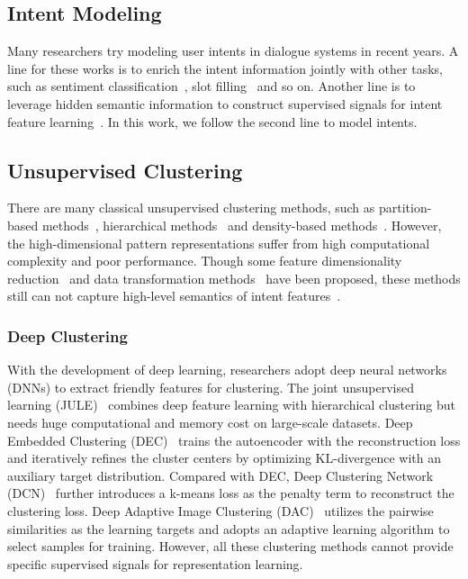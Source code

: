 \documentclass[letterpaper]{article} \usepackage{aaai21}  \usepackage{times}  \usepackage{helvet} \usepackage{courier}  \usepackage[hyphens]{url}  \usepackage{graphicx} \urlstyle{rm} \def\UrlFont{\rm}  \usepackage{natbib}  \usepackage{caption} \frenchspacing  \setlength{\pdfpagewidth}{8.5in}  \setlength{\pdfpageheight}{11in}  \usepackage{amsmath}
\begin{document}
	\subsection{Intent Modeling}
	Many researchers try modeling user intents in dialogue systems in recent years. A line for these works is to enrich the intent information jointly with other tasks, such as sentiment classification~\cite{Qin_Che_Li_Ni_Liu_2020}, slot filling~\cite{qin-etal-2019-stack,goo-etal-2018-slot,wang-etal-2018-bi} and so on. Another line is to 
	leverage hidden semantic information to construct supervised signals for intent feature learning~\cite{shi2018auto,Brychcin2017UnsupervisedDA,hakkani-tr2013a}. In this work, we follow the second line to model intents. 
	
	\subsection{Unsupervised Clustering}
	There are many classical unsupervised clustering methods, such as partition-based methods~\cite{macqueen1967some}, hierarchical methods~\cite{gowda1978agglomerative} and density-based methods~\cite{ester1996density}. However, the high-dimensional pattern representations suffer from high computational complexity and poor performance. Though some feature dimensionality reduction~\cite{1984A} and data transformation methods~\cite{wold1987principal} have been proposed, these methods still can not capture high-level semantics of intent features~\cite{lin-xu-2019-deep}. 
	
	\subsubsection{Deep Clustering}
	With the development of deep learning, researchers adopt deep neural networks (DNNs) to extract friendly features for clustering. The joint unsupervised learning (JULE)~\cite{yang2016joint} combines deep feature learning with hierarchical clustering but needs huge computational and memory cost on large-scale datasets. Deep Embedded Clustering (DEC)~\cite{xie2016unsupervised} trains the autoencoder with the reconstruction loss and iteratively refines the cluster centers by optimizing KL-divergence with an auxiliary target distribution. Compared with DEC, Deep Clustering Network (DCN)~\cite{yang2017towards} further introduces a k-means loss as the penalty term to reconstruct the clustering loss. Deep Adaptive Image Clustering (DAC)~\cite{chang2017deep} utilizes the pairwise similarities as the learning targets and adopts an adaptive learning algorithm to select samples for training. However, all these clustering methods cannot provide specific supervised signals for representation learning.
	
\end{document}
